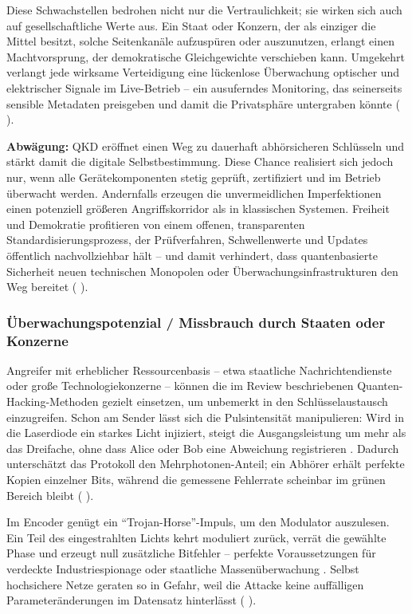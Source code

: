 Diese Schwachstellen bedrohen nicht nur die Vertraulichkeit; sie wirken sich auch auf gesellschaftliche Werte aus. Ein Staat oder Konzern, der als einziger die Mittel besitzt, solche Seitenkanäle aufzuspüren oder auszunutzen, erlangt einen Machtvorsprung, der demokratische Gleichgewichte verschieben kann. Umgekehrt verlangt jede wirksame Verteidigung eine lückenlose Überwachung optischer und elektrischer Signale im Live-Betrieb – ein ausuferndes Monitoring, das seinerseits sensible Metadaten preisgeben und damit die Privatsphäre untergraben könnte (\cite{sunReviewSecurityEvaluation2022} ).

\textbf{Abwägung:}
QKD eröffnet einen Weg zu dauerhaft abhörsicheren Schlüsseln und stärkt damit die digitale Selbstbestimmung. Diese Chance realisiert sich jedoch nur, wenn alle Gerätekomponenten stetig geprüft, zertifiziert und im Betrieb überwacht werden. Andernfalls erzeugen die unvermeidlichen Imperfektionen einen potenziell größeren Angriffskorridor als in klassischen Systemen. Freiheit und Demokratie profitieren von einem offenen, transparenten Standardisierungsprozess, der Prüfverfahren, Schwellenwerte und Updates öffentlich nachvollziehbar hält – und damit verhindert, dass quantenbasierte Sicherheit neuen technischen Monopolen oder Überwachungsinfrastrukturen den Weg bereitet (\cite{sunReviewSecurityEvaluation2022} ).

\subsubsection{Überwachungspotenzial / Missbrauch durch Staaten oder Konzerne}
Angreifer mit erheblicher Ressourcenbasis – etwa staatliche Nachrichtendienste oder große Technologiekonzerne – können die im Review beschriebenen Quanten-Hacking-Methoden gezielt einsetzen, um unbemerkt in den Schlüsselaustausch einzugreifen. Schon am Sender lässt sich die Pulsintensität manipulieren: Wird in die Laserdiode ein starkes Licht injiziert, steigt die Ausgangsleistung um mehr als das Dreifache, ohne dass Alice oder Bob eine Abweichung registrieren . Dadurch unterschätzt das Protokoll den Mehrphotonen-Anteil; ein Abhörer erhält perfekte Kopien einzelner Bits, während die gemessene Fehlerrate scheinbar im grünen Bereich bleibt (\cite{sunReviewSecurityEvaluation2022} ).

Im Encoder genügt ein “Trojan-Horse”-Impuls, um den Modulator auszulesen. Ein Teil des eingestrahlten Lichts kehrt moduliert zurück, verrät die gewählte Phase und erzeugt null zusätzliche Bitfehler – perfekte Voraussetzungen für verdeckte Industriespionage oder staatliche Massenüberwachung . Selbst hochsichere Netze geraten so in Gefahr, weil die Attacke keine auffälligen Parameteränderungen im Datensatz hinterlässt (\cite{sunReviewSecurityEvaluation2022} ).

